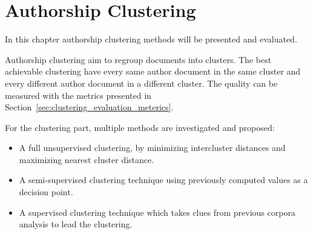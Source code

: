 \section{Authorship Clustering \label{sec:clustering}}

In this chapter authorship clustering methods will be presented and evaluated.

Authorship clustering aim to regroup documents into clusters.
The best achievable clustering have every same author document in the same cluster and every different author document in a different cluster.
The quality can be measured with the metrics presented in Section~\ref{sec:clustering_evaluation_meterics}.

For the clustering part, multiple methods are investigated and proposed:
\begin{itemize}
  \item
  A full unsupervised clustering, by minimizing intercluster distances and maximizing nearest cluster distance.
  \item
  A semi-supervised clustering technique using previously computed values as a decision point.
  \item
  A supervised clustering technique which takes clues from previous corpora analysis to lead the clustering.
\end{itemize}






